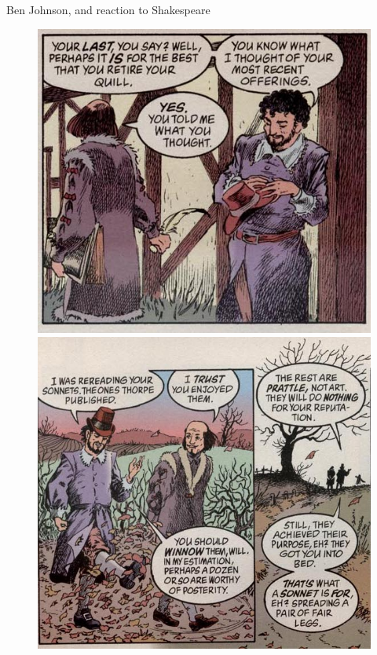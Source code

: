 \documentclass{beamer}
\begin{document}
  \begin{frame}{Ben Johnson, and reaction to Shakespeare}

      \begin{figure}[htp]
        \begin{center}
          \centering
          \includegraphics[scale=0.32]{ben.jpg}
          \includegraphics[scale=0.28]{ben2.jpg}
        \end{center}
      \end{figure}
      

\end{frame}
\end{document}
